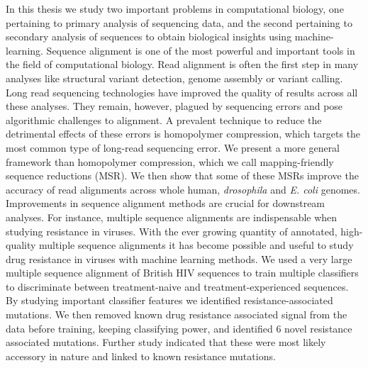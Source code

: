 In this thesis we study two important problems in computational biology, one pertaining to primary analysis of sequencing data, and the second pertaining to secondary analysis of sequences to obtain biological insights using machine-learning.
Sequence alignment is one of the most powerful and important tools in the field of computational biology. Read alignment is often the first step in many analyses like structural variant detection, genome assembly or variant calling. Long read sequencing technologies have improved the quality of results across all these analyses. They remain, however, plagued by sequencing errors and pose algorithmic challenges to alignment. A prevalent technique to reduce the detrimental effects of these errors is homopolymer compression, which targets the most common type of long-read sequencing error. 
We present a more general framework than homopolymer compression, which we call mapping-friendly sequence reductions (MSR). We then show that some of these MSRs improve the accuracy of read alignments across whole human, \textit{drosophila} and \textit{E. coli} genomes. 
Improvements in sequence alignment methods are crucial for downstream analyses. For instance, multiple sequence alignments are indispensable when studying resistance in viruses. With the ever growing quantity of annotated, high-quality multiple sequence alignments it has become possible and useful to study drug resistance in viruses with machine learning methods. 
We used a very large multiple sequence alignment of British HIV sequences to train multiple classifiers to discriminate between treatment-naive and treatment-experienced sequences. By studying important classifier features we identified resistance-associated mutations. We then removed known drug resistance associated signal from the data before training, keeping classifying power, and identified 6 novel resistance associated mutations. Further study indicated that these were most likely accessory in nature and linked to known resistance mutations.
